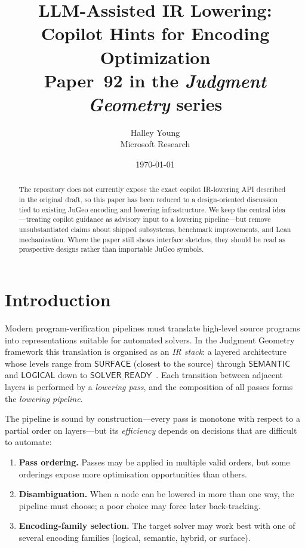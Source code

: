 \documentclass[11pt]{article}
\title{\textbf{LLM-Assisted IR Lowering:\\
Copilot Hints for Encoding Optimization}\\[4pt]
\large Paper~92 in the \emph{Judgment Geometry} series}
\author{Halley Young \\ Microsoft Research}
\date{\today}
\newcommand{\Surface}{\mathsf{SURFACE}}
\newcommand{\Semantic}{\mathsf{SEMANTIC}}
\newcommand{\Logical}{\mathsf{LOGICAL}}
\newcommand{\SolverReady}{\mathsf{SOLVER\_READY}}
\begin{document}
\maketitle

\begin{abstract}
The repository does not currently expose the exact copilot IR-lowering
API described in the original draft, so this paper has been reduced to a
design-oriented discussion tied to existing JuGeo encoding and lowering
infrastructure.  We keep the central idea---treating copilot guidance as
advisory input to a lowering pipeline---but remove unsubstantiated
claims about shipped subsystems, benchmark improvements, and Lean
mechanization.  Where the paper still shows interface sketches, they
should be read as prospective designs rather than importable JuGeo
symbols.
\end{abstract}

\newpage

\section{Introduction}\label{sec:intro}

Modern program-verification pipelines must translate high-level source
programs into representations suitable for automated solvers.  In the
Judgment Geometry framework this translation is organised as an
\emph{IR stack}: a layered architecture whose levels range from
$\Surface$ (closest to the source) through $\Semantic$ and $\Logical$
down to $\SolverReady$~\cite{young2024jugeo}.  Each transition between
adjacent layers is performed by a \emph{lowering pass}, and the
composition of all passes forms the \emph{lowering pipeline}.

The pipeline is sound by construction---every pass is monotone with
respect to a partial order on layers---but its \emph{efficiency}
depends on decisions that are difficult to automate:

\begin{enumerate}
\item \textbf{Pass ordering.}  Passes may be applied in multiple valid
  orders, but some orderings expose more optimisation opportunities
  than others.
\item \textbf{Disambiguation.}  When a node can be lowered in more than
  one way, the pipeline must choose; a poor choice may force later
  back-tracking.
\item \textbf{Encoding-family selection.}  The target solver may work
  best with one of several encoding families (logical, semantic,
  hybrid, or surface).
\end{enumerate}
\end{document}
